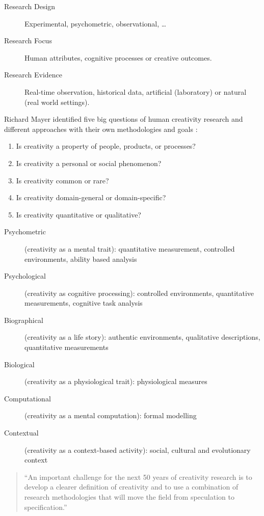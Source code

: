 \begin{description}
  \item [Research Design] Experimental, psychometric, observational, \ldots
  \item [Research Focus] Human attributes, cognitive processes or creative outcomes.
  \item [Research Evidence] Real-time observation, historical data, artificial (laboratory) or natural (real world settings).
\end{description}

Richard Mayer identified five big questions of human creativity research and different approaches with their own methodologies and goals \autocite[p.450-451,453]{Mayer1999}:

\label{s:Mayer5questions}
\begin{enumerate}
  \item Is creativity a property of people, products, or processes?
  \item Is creativity a personal or social phenomenon?
  \item Is creativity common or rare?
  \item Is creativity domain-general or domain-specific?
  \item Is creativity quantitative or qualitative?
\end{enumerate}

\begin{description}
  \item [Psychometric] (creativity as a mental trait): quantitative measurement, controlled environments, ability based analysis
  \item [Psychological] (creativity as cognitive processing): controlled environments, quantitative measurements, cognitive task analysis
  \item [Biographical] (creativity as a life story): authentic environments, qualitative descriptions, quantitative measurements
  \item [Biological] (creativity as a physiological trait): physiological measures
  \item [Computational] (creativity as a mental computation): formal modelling
  \item [Contextual] (creativity as a context-based activity): social, cultural and evolutionary context
\end{description}

\begin{quotation}
  ``An important challenge for the next 50 years of creativity research is to develop a clearer definition of creativity and to use a combination of research methodologies that will move the field from speculation to specification.'' 
\end{quotation}

